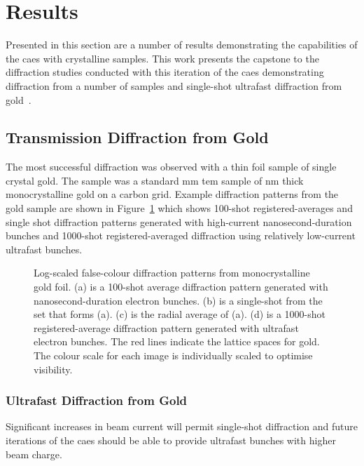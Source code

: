 \section{Results}

Presented in this section are a number of results demonstrating the capabilities of the \gls{caes} with crystalline samples.
This work presents the capstone to the diffraction studies conducted with this iteration of the \gls{caes} demonstrating diffraction from a number of samples and single-shot ultrafast diffraction from gold~\cite{speirs_single-shot_2015}.

\subsection{Transmission Diffraction from Gold}

The most successful diffraction was observed with a thin foil sample of single crystal gold.
The sample was a standard \unit[3]{mm} \gls{tem} sample of \unit[11]{nm} thick monocrystalline gold on a carbon grid.
Example diffraction patterns from the gold sample are shown in Figure~\ref{figure:au_diffraction} which shows 100-shot registered-averages and single shot diffraction patterns generated with high-current nanosecond-duration bunches and 1000-shot registered-averaged diffraction using relatively low-current ultrafast bunches.

\begin{figure}
    \center
    
    \caption[Diffraction patterns from gold.]{Log-scaled false-colour diffraction patterns from monocrystalline gold foil. (a) is a 100-shot average diffraction pattern generated with nanosecond-duration electron bunches. (b) is a single-shot from the set that forms (a). (c) is the radial average of (a). (d) is a 1000-shot registered-average diffraction pattern generated with ultrafast electron bunches. The red lines indicate the lattice spaces for gold. The colour scale for each image is individually scaled to optimise visibility.}
    \label{figure:au_diffraction}
\end{figure}

\subsubsection{Ultrafast Diffraction from Gold}

Significant increases in beam current will permit single-shot diffraction and future iterations of the \gls{caes} should be able to provide ultrafast bunches with higher beam charge.

